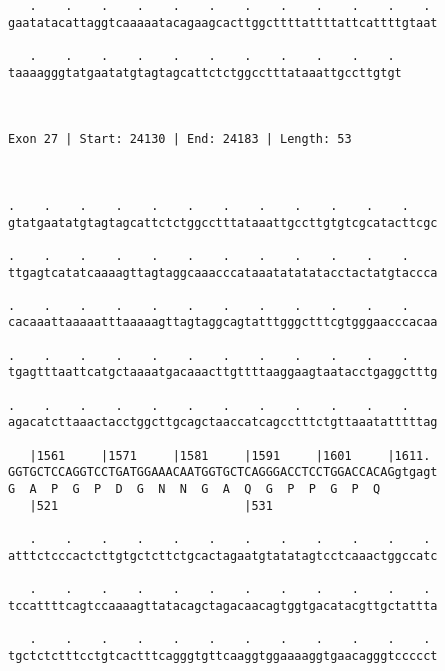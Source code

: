 \documentclass{article}
\begin{document}
\begin{Verbatim}
   .    .    .    .    .    .    .    .    .    .    .    . 
gaatatacattaggtcaaaaatacagaagcacttggcttttattttattcattttgtaat
                                                            
   .    .    .    .    .    .    .    .    .    .    . 
taaaagggtatgaatatgtagtagcattctctggcctttataaattgccttgtgt
                                                       
                                                       
 
Exon 27 | Start: 24130 | End: 24183 | Length: 53



.    .    .    .    .    .    .    .    .    .    .    .    
gtatgaatatgtagtagcattctctggcctttataaattgccttgtgtcgcatacttcgc
                                                            
.    .    .    .    .    .    .    .    .    .    .    .    
ttgagtcatatcaaaagttagtaggcaaacccataaatatatatacctactatgtaccca
                                                            
.    .    .    .    .    .    .    .    .    .    .    .    
cacaaattaaaaatttaaaaagttagtaggcagtatttgggctttcgtgggaacccacaa
                                                            
.    .    .    .    .    .    .    .    .    .    .    .    
tgagtttaattcatgctaaaatgacaaacttgttttaaggaagtaatacctgaggctttg
                                                            
.    .    .    .    .    .    .    .    .    .    .    .    
agacatcttaaactacctggcttgcagctaaccatcagcctttctgttaaatatttttag
                                                            
   |1561     |1571     |1581     |1591     |1601     |1611. 
GGTGCTCCAGGTCCTGATGGAAACAATGGTGCTCAGGGACCTCCTGGACCACAGgtgagt
G  A  P  G  P  D  G  N  N  G  A  Q  G  P  P  G  P  Q        
   |521                          |531                       
  
   .    .    .    .    .    .    .    .    .    .    .    . 
atttctcccactcttgtgctcttctgcactagaatgtatatagtcctcaaactggccatc
                                                            
   .    .    .    .    .    .    .    .    .    .    .    . 
tccattttcagtccaaaagttatacagctagacaacagtggtgacatacgttgctattta
                                                            
   .    .    .    .    .    .    .    .    .    .    .    . 
tgctctctttcctgtcactttcagggtgttcaaggtggaaaaggtgaacagggtccccct
                                                            

\end{Verbatim}
\end{document}
